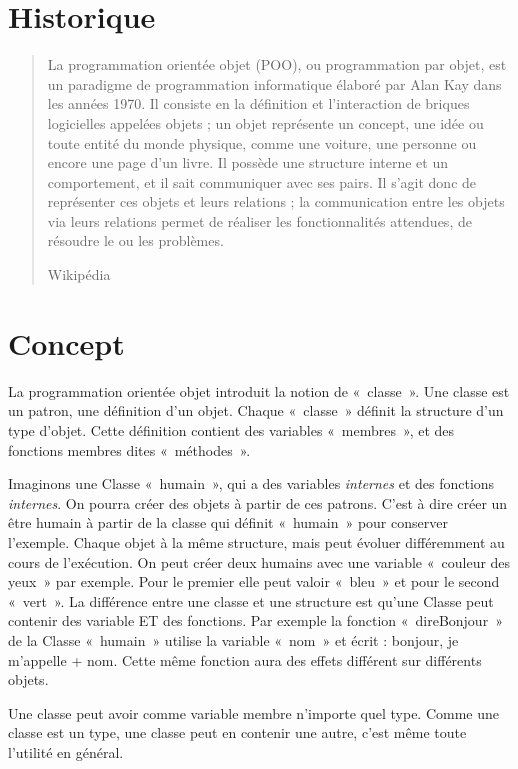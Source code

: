 
  \label{DefPOO}
  \section{Historique}
  	\begin{quotation}
  		La programmation orientée objet (POO), ou programmation par objet, est un paradigme de programmation informatique élaboré par Alan Kay dans les années 1970. Il consiste en la définition et l'interaction de briques logicielles appelées objets ; un objet représente un concept, une idée ou toute entité du monde physique, comme une voiture, une personne ou encore une page d'un livre. Il possède une structure interne et un comportement, et il sait communiquer avec ses pairs. Il s'agit donc de représenter ces objets et leurs relations ; la communication entre les objets via leurs relations permet de réaliser les fonctionnalités attendues, de résoudre le ou les problèmes.
  		\begin{flushright}
  			Wikipédia
  		\end{flushright}
  	\end{quotation}
  \section{Concept}
    La programmation orientée objet introduit la notion de «~classe~». Une classe est 
    un patron, une définition d'un objet. Chaque «~classe~» définit la structure d'un type
    d'objet. Cette définition contient des variables «~membres~», et des fonctions membres dites «~méthodes~».
    
    Imaginons une Classe «~humain~», qui a des variables \textit{internes} et
    des fonctions \textit{internes}. On pourra créer des objets à partir de ces patrons. C'est à dire 
    créer un être humain à partir de la classe qui définit «~humain~» pour conserver l'exemple. Chaque objet 
    à la même structure, mais peut évoluer différemment au cours de l’exécution. On peut créer
    deux humains avec une variable «~couleur des yeux~» par exemple. Pour le premier elle peut valoir «~bleu~» et pour le second «~vert~». La différence entre une classe et une structure est qu'une Classe 
    peut contenir des variable ET des fonctions. Par exemple la fonction «~direBonjour~» de la 
    Classe «~humain~» utilise la variable «~nom~» et écrit : bonjour, je m'appelle + nom.
    Cette même fonction aura des effets différent sur différents objets.
    
    Une classe peut avoir comme variable membre n'importe quel type. Comme une classe est un type, une classe peut en contenir une autre, c'est même toute l'utilité en général.
